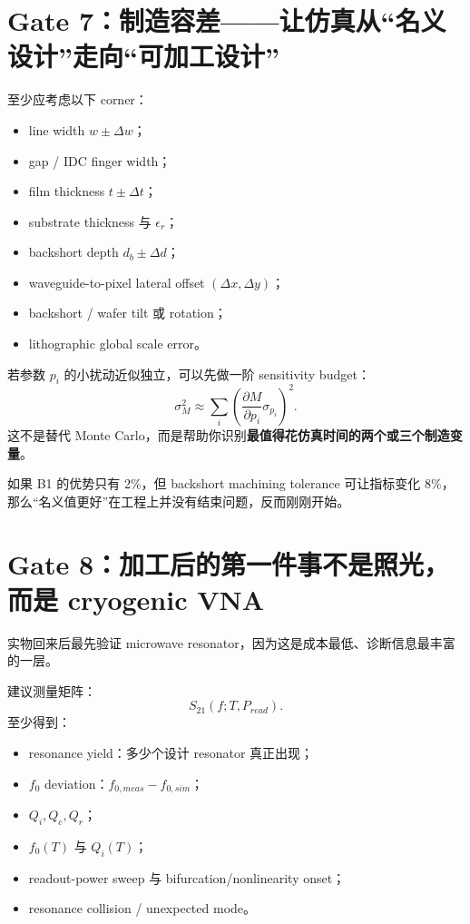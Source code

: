 \documentclass[11pt,a4paper,openany]{ctexrep}
\begin{document}
\section{Gate 7：制造容差——让仿真从“名义设计”走向“可加工设计”}

至少应考虑以下 corner：
\begin{itemize}
  \item line width $w\pm\Delta w$；
  \item gap / IDC finger width；
  \item film thickness $t\pm\Delta t$；
  \item substrate thickness 与 $\epsilon_r$；
  \item backshort depth $d_b\pm\Delta d$；
  \item waveguide-to-pixel lateral offset $(\Delta x,\Delta y)$；
  \item backshort / wafer tilt 或 rotation；
  \item lithographic global scale error。
\end{itemize}

若参数 $p_i$ 的小扰动近似独立，可以先做一阶 sensitivity budget：
\[
\sigma_M^2\approx\sum_i
\left(\frac{\partial M}{\partial p_i}\sigma_{p_i}\right)^2.
\]
这不是替代 Monte Carlo，而是帮助你识别\textbf{最值得花仿真时间的两个或三个制造变量}。

\begin{checkpointbox}
如果 B1 的优势只有 2\%，但 backshort machining tolerance 可让指标变化 8\%，那么“名义值更好”在工程上并没有结束问题，反而刚刚开始。
\end{checkpointbox}

\section{Gate 8：加工后的第一件事不是照光，而是 cryogenic VNA}

实物回来后最先验证 microwave resonator，因为这是成本最低、诊断信息最丰富的一层。

建议测量矩阵：
\[
S_{21}(f;T,P_{read}).
\]
至少得到：
\begin{itemize}
  \item resonance yield：多少个设计 resonator 真正出现；
  \item $f_0$ deviation：$f_{0,meas}-f_{0,sim}$；
  \item $Q_i,Q_c,Q_r$；
  \item $f_0(T)$ 与 $Q_i(T)$；
  \item readout-power sweep 与 bifurcation/nonlinearity onset；
  \item resonance collision / unexpected mode。
\end{itemize}
\end{document}
